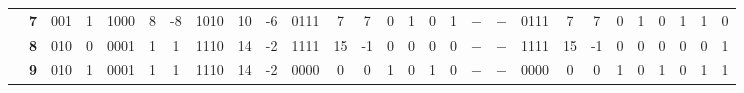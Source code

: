 \begin{figure}[H]
\begin{tcolorbox}[left=5mm,right=5mm,top=0mm,bottom=5mm,boxsep=0mm,
toptitle=0.5mm,bottomtitle=0.5mm,title=Resultados Teóricos \textit{versus} Resultados Experimentais,center title]
\begin{minipage}{\textwidth}
{\begin{tabular}{c|c|c|c|c|c|c|c|c|c|c|c|c|c|c|c|c|c|c|c|c|c|c|c|c|c|c|c|}
\cline{2-28}
                                                                                                           & \textbf{7}           & 001                  & 1                    & 1000                 & 8                                           & -8                                          & 1010                 & 10                                          & -6                                          & 0111                 & 7                                           & 7                                           & 0                    & 1                    & 0                    & 1                    & $-$                    & $-$                    & 0111                 & 7                                           & 7                                           & 0                    & 1                    & 0                    & 1                    & 1                    & 0                     \\ 
\cline{2-28}
                                                                                                           & \textbf{8}           & 010                  & 0                    & 0001                 & 1                                           & 1                                           & 1110                 & 14                                          & -2                                          & 1111                 & 15                                          & -1                                          & 0                    & 0                    & 0                    & 0                    & $-$                    & $-$                    & 1111                 & 15                                          & -1                                          & 0                    & 0                    & 0                    & 0                    & 0                    & 1                     \\ 
\cline{2-28}
                                                                                                           & \textbf{9}           & 010                  & 1                    & 0001                 & 1                                           & 1                                           & 1110                 & 14                                          & -2                                          & 0000                 & 0                                           & 0                                           & 1                    & 0                    & 1                    & 0                    & $-$                    & $-$                    & 0000                 & 0                                           & 0                                           & 1                    & 0                    & 1                    & 0                    & 1                    & 1                     \\ 

\end{tabular}}
\end{minipage}
\end{tcolorbox}
\end{figure}
